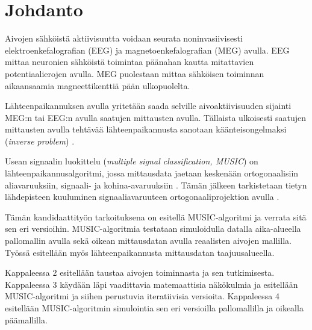 \section{Johdanto}

Aivojen sähköistä aktiivisuutta voidaan seurata noninvasiivisesti elektroenkefalografian (EEG) ja magnetoenkefalografian (MEG) avulla. EEG mittaa neuronien sähköistä toimintaa päänahan kautta mitattavien potentiaalierojen avulla. MEG puolestaan mittaa sähköisen toiminnan aikaansaamia magneettikenttiä pään ulkopuolelta. \citep{Hamalainen1993MagnetoencephalographytheoryBrain}

Lähteenpaikannuksen avulla yritetään saada selville aivoaktiivisuuden sijainti MEG:n tai EEG:n avulla saatujen mittausten avulla. Tällaista ulkoisesti saatujen mittausten avulla tehtävää lähteenpaikannusta sanotaan käänteisongelmaksi (\textit{inverse problem}) \citep[s. 2]{hansen2010meg}.

Usean signaalin luokittelu (\textit{multiple signal classification, MUSIC}) on lähteenpaikannusalgoritmi, jossa mittausdata jaetaan keskenään ortogonaalisiin aliavaruuksiin, signaali- ja kohina-avaruuksiin \citep{Schmidt1986MultipleEstimation}. Tämän jälkeen tarkistetaan tietyn lähdepisteen kuuluminen signaaliavaruuteen ortogonaaliprojektion avulla \citep{Mosher1999SourceMUSIC}.

Tämän kandidaattityön tarkoituksena on esitellä MUSIC-algoritmi ja verrata sitä sen eri versioihin. MUSIC-algoritmia testataan simuloidulla datalla aika-alueella pallomallin avulla sekä oikean mittausdatan avulla reaalisten aivojen mallilla. Työssä esitellään myös lähteenpaikannusta mittausdatan taajuusalueella.

Kappaleessa 2 esitellään taustaa aivojen toiminnasta ja sen tutkimisesta. Kappaleessa 3 käydään läpi vaadittavia matemaattisia näkökulmia ja esitellään MUSIC-algoritmi ja siihen perustuvia iteratiivisia versioita. Kappaleessa 4 esitellään MUSIC-algoritmin simulointia sen eri versioilla pallomallilla ja oikealla päämallilla.